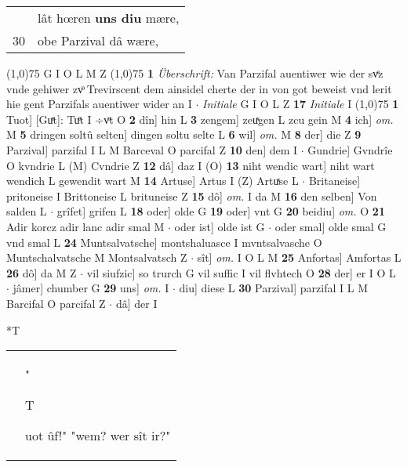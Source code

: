 \documentclass[8pt,a4paper,notitlepage]{article}
\begin{document}
\begin{table}[ht]
\begin{minipage}[t]{0.5\linewidth}
\begin{tabular}{rl}
 & lât hœren \textbf{uns diu} mære,\\ 
30 & obe Parzival dâ wære,\\ 
\end{tabular}
\scriptsize
\line(1,0){75} \newline
G I O L M Z \newline
\line(1,0){75} \newline
\textbf{1} \textit{Überschrift:} Van Parzifal auentiwer wie der svͤz vnde gehiwer zvͦ Trevirscent dem ainsidel cherte der in von got beweist vnd lerit hie gent Parzifals auentiwer wider an I   $\cdot$ \textit{Initiale} G I O L Z  \textbf{17} \textit{Initiale} I  \newline
\line(1,0){75} \newline
\textbf{1} Tuot] [Guͤt]: Tuͤt I ÷vͦt O \textbf{2} dîn] hin L \textbf{3} zengem] zeuͯgen L zcu gein M \textbf{4} ich] \textit{om.} M \textbf{5} dringen soltû selten] dingen soltu selte L \textbf{6} wil] \textit{om.} M \textbf{8} der] die Z \textbf{9} Parzival] parzifal I L M Barceval O parcifal Z \textbf{10} den] dem I  $\cdot$ Gundrie] Gvndrîe O kvndrie L (M) Cvndrie Z \textbf{12} dâ] daz I (O) \textbf{13} niht wendic wart] niht wart wendich L gewendit wart M \textbf{14} Artuse] Artus I (Z) Artuͯse L  $\cdot$ Britaneise] pritoneise I Brittoneise L brituneise Z \textbf{15} dô] \textit{om.} I da M \textbf{16} den selben] Von salden L  $\cdot$ grîfet] grifen L \textbf{18} oder] olde G \textbf{19} oder] vnt G \textbf{20} beidiu] \textit{om.} O \textbf{21} Adir korcz adir lanc adir smal M  $\cdot$ oder ist] olde ist G  $\cdot$ oder smal] olde smal G vnd smal L \textbf{24} Muntsalvatsche] montshaluasce I mvntsalvasche O Muntschalvatsche M Montsalvatsch Z  $\cdot$ sît] \textit{om.} I O L M \textbf{25} Anfortas] Amfortas L \textbf{26} dô] da M Z  $\cdot$ vil siufzic] so trurch G vil suffic I vil flvhtech O \textbf{28} der] er I O L  $\cdot$ jâmer] chumber G \textbf{29} uns] \textit{om.} I  $\cdot$ diu] diese L \textbf{30} Parzival] parzifal I L M Barcifal O parcifal Z  $\cdot$ dâ] der I \newline
\end{minipage}
\hspace{0.5cm}
\begin{minipage}[t]{0.5\linewidth}
\small
\begin{center}*T
\end{center}
\begin{tabular}{rl}
 & "\begin{Large}T\end{Large}uot ûf!" "wem? wer sît ir?"\\ 

\end{tabular}
\end{minipage}
\end{table}
\end{document}
